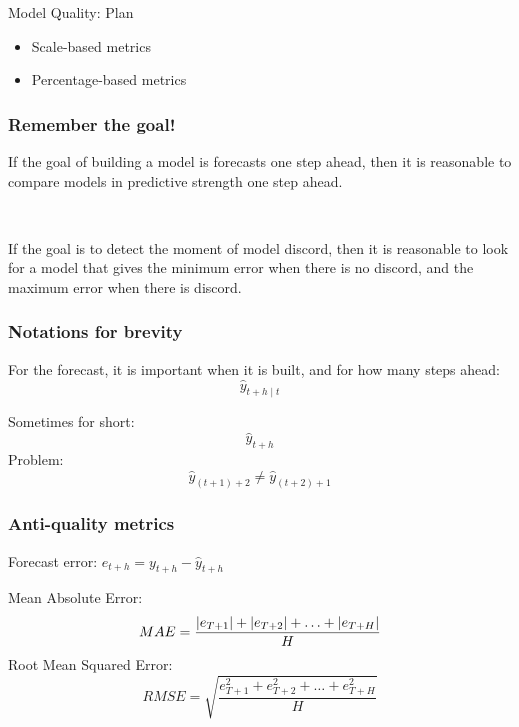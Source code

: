 
\begin{frame} %
	
	
\end{frame}



\begin{frame}{Model Quality: Plan}
	\begin{itemize}[<+->]
		\item Scale-based metrics
		\item Percentage-based metrics
	\end{itemize}
	
\end{frame}


\begin{frame}
	\frametitle{Remember the goal!}
	
	
	
	If the goal of building a model is forecasts one step ahead,
	then it is reasonable to compare models in predictive strength one step ahead.
	
	\pause
	\
	
	If the goal is to detect  the moment of model discord,
	then it is reasonable to look for a model that gives the minimum error when there is no discord,
	and the maximum error when there is discord.
	
\end{frame}

\begin{frame}
	\frametitle{Notations for brevity}
	
	For the forecast, it is important \alert{when} it is built, and for \alert{how many steps ahead}:
	\[
	\hat y_{t+h \mid t}
	\]
	
	\pause
	Sometimes for \alert{short}:
	\[
	\hat y_{t+h}
	\]
	\pause
	Problem:
	\[
	\hat y_{(t+1) + 2} \neq \hat y_{(t+2) + 1}
	\]
	
\end{frame}


\begin{frame}
	\frametitle{Anti-quality metrics}
	
	\alert{Forecast error}: $e_{t+h} = y_{t+h} - \hat y_{t+h}$
	
	\pause
	\alert{Mean Absolute Error}:
	\[
	MAE = \frac{\abs {e_{T+1}} + \abs{e_{T+2}}+ \ldots + \abs{e_{T+H}} }{H}
	\]
	\pause
	\alert{Root Mean Squared Error}:
	\[
	RMSE = \sqrt{ \frac{e^2_{T+1} + e^2_{T+2}+ \ldots + e^2_{T+H} }{H} }
	\]
	
\end{frame}


